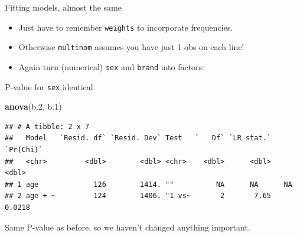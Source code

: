 \documentclass[
  ignorenonframetext,
]{beamer}
\newenvironment{Shaded}{\begin{snugshade}}{\end{snugshade}}
\newcommand{\DataTypeTok}[1]{\textcolor[rgb]{0.13,0.29,0.53}{#1}}
\newcommand{\FloatTok}[1]{\textcolor[rgb]{0.00,0.00,0.81}{#1}}
\newcommand{\KeywordTok}[1]{\textcolor[rgb]{0.13,0.29,0.53}{\textbf{#1}}}
\newcommand{\NormalTok}[1]{#1}
\newcommand{\OperatorTok}[1]{\textcolor[rgb]{0.81,0.36,0.00}{\textbf{#1}}}
\newcommand{\StringTok}[1]{\textcolor[rgb]{0.31,0.60,0.02}{#1}}
\begin{document}
\begin{frame}[fragile]{Fitting models, almost the same}
\protect\hypertarget{fitting-models-almost-the-same}{}

\begin{itemize}
\item
  Just have to remember \texttt{weights} to incorporate frequencies.
\item
  Otherwise \texttt{multinom} assumes you have just 1 obs on each line!
\item
  Again turn (numerical) \texttt{sex} and \texttt{brand} into factors:
\end{itemize}

\footnotesize

\begin{Shaded}
\end{Shaded}

\normalsize

\end{frame}

\begin{frame}[fragile]{P-value for \texttt{sex} identical}
\protect\hypertarget{p-value-for-sex-identical}{}

\footnotesize

\begin{Shaded}
\begin{Highlighting}[]
\KeywordTok{anova}\NormalTok{(b}\FloatTok{.2}\NormalTok{, b}\FloatTok{.1}\NormalTok{)}
\end{Highlighting}
\end{Shaded}

\begin{verbatim}
## # A tibble: 2 x 7
##   Model   `Resid. df` `Resid. Dev` Test   `   Df` `LR stat.` `Pr(Chi)`
##   <chr>         <dbl>        <dbl> <chr>    <dbl>      <dbl>     <dbl>
## 1 age             126        1414. ""          NA      NA      NA     
## 2 age + ~         124        1406. "1 vs~       2       7.65    0.0218
\end{verbatim}

\normalsize

Same P-value as before, so we haven't changed anything important.

\end{frame}
\end{document}
